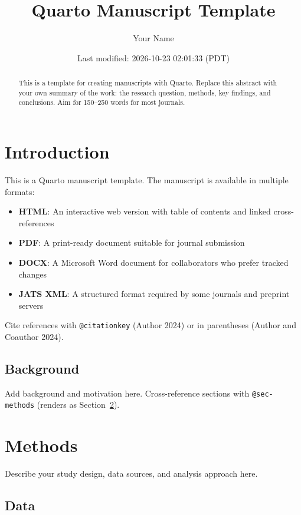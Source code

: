 \documentclass[
  letterpaper,
  DIV=11,
  numbers=noendperiod]{scrartcl}
\title{Quarto Manuscript Template}
\author{Your Name}
\date{Last modified: 2026-10-23 02:01:33 (PDT)}
\providecommand{\tightlist}{%
  \setlength{\itemsep}{0pt}\setlength{\parskip}{0pt}}
\begin{document}
\maketitle
\begin{abstract}
This is a template for creating manuscripts with Quarto. Replace this
abstract with your own summary of the work: the research question,
methods, key findings, and conclusions. Aim for 150--250 words for most
journals.
\end{abstract}


\section{Introduction}\label{sec-intro}

This is a Quarto manuscript template. The manuscript is available in
multiple formats:

\begin{itemize}
\tightlist
\item
  \textbf{HTML}: An interactive web version with table of contents and
  linked cross-references
\item
  \textbf{PDF}: A print-ready document suitable for journal submission
\item
  \textbf{DOCX}: A Microsoft Word document for collaborators who prefer
  tracked changes
\item
  \textbf{JATS XML}: A structured format required by some journals and
  preprint servers
\end{itemize}

Cite references with \texttt{@citationkey} (Author 2024) or in
parentheses (Author and Coauthor 2024).

\subsection{Background}\label{background}

Add background and motivation here. Cross-reference sections with
\texttt{@sec-methods} (renders as Section~\ref{sec-methods}).

\section{Methods}\label{sec-methods}

Describe your study design, data sources, and analysis approach here.

\subsection{Data}\label{data}
\end{document}
